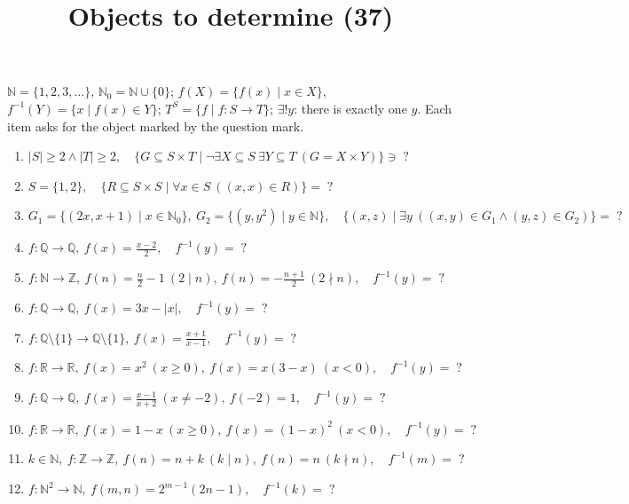 \documentclass[11pt,a4paper]{article}
\title{Objects to determine (37)}
\author{}
\date{}
\begin{document}
\maketitle
$\mathbb{N} = \{1, 2, 3, \ldots\}$, $\mathbb{N}_{0} = \mathbb{N} \cup \{0\}$; $f(X) = \{f(x) \mid x \in X\}$, $f^{-1}(Y) = \{x \mid f(x) \in Y\}$; $T^{S} = \{f \mid f \colon S \to T\}$; $\exists! y$: there is exactly one $y$. Each item asks for the object marked by the question mark.

\begin{enumerate}
\item $\displaystyle |S| \ge 2 \land |T| \ge 2,\quad \{G \subseteq S \times T \mid \lnot \exists X \subseteq S\ \exists Y \subseteq T\ (G = X \times Y)\} \ni\;?$
\item $\displaystyle S = \{1, 2\},\quad \{R \subseteq S \times S \mid \forall x \in S\ ((x, x) \in R)\} =\;?$
\item $\displaystyle G_{1} = \{(2x, x + 1) \mid x \in \mathbb{N}_{0}\},\ G_{2} = \{(y, y^{2}) \mid y \in \mathbb{N}\},\quad \{(x, z) \mid \exists y\ ((x, y) \in G_{1} \land (y, z) \in G_{2})\} =\;?$
\item $\displaystyle f \colon \mathbb{Q} \to \mathbb{Q},\ f(x) = \frac{x - 2}{2},\quad f^{-1}(y) =\;?$
\item $\displaystyle f \colon \mathbb{N} \to \mathbb{Z},\ f(n) = \frac{n}{2} - 1\ (2 \mid n),\ f(n) = -\frac{n + 1}{2}\ (2 \nmid n),\quad f^{-1}(y) =\;?$
\item $\displaystyle f \colon \mathbb{Q} \to \mathbb{Q},\ f(x) = 3x - |x|,\quad f^{-1}(y) =\;?$
\item $\displaystyle f \colon \mathbb{Q} \setminus \{1\} \to \mathbb{Q} \setminus \{1\},\ f(x) = \frac{x + 1}{x - 1},\quad f^{-1}(y) =\;?$
\item $\displaystyle f \colon \mathbb{R} \to \mathbb{R},\ f(x) = x^{2}\ (x \ge 0),\ f(x) = x(3 - x)\ (x < 0),\quad f^{-1}(y) =\;?$
\item $\displaystyle f \colon \mathbb{Q} \to \mathbb{Q},\ f(x) = \frac{x - 1}{x + 2}\ (x \neq -2),\ f(-2) = 1,\quad f^{-1}(y) =\;?$
\item $\displaystyle f \colon \mathbb{R} \to \mathbb{R},\ f(x) = 1 - x\ (x \ge 0),\ f(x) = (1 - x)^{2}\ (x < 0),\quad f^{-1}(y) =\;?$
\item $\displaystyle k \in \mathbb{N},\ f \colon \mathbb{Z} \to \mathbb{Z},\ f(n) = n + k\ (k \mid n),\ f(n) = n\ (k \nmid n),\quad f^{-1}(m) =\;?$
\item $\displaystyle f \colon \mathbb{N}^{2} \to \mathbb{N},\ f(m, n) = 2^{m - 1}(2n - 1),\quad f^{-1}(k) =\;?$

\end{enumerate}
\end{document}
